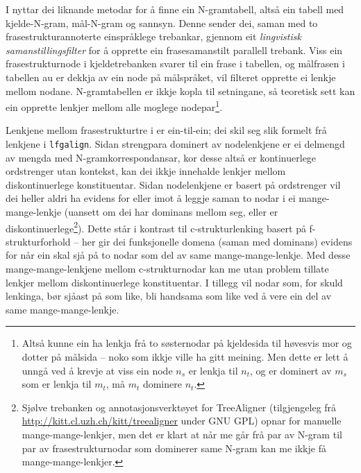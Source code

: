\documentclass[12pt,a4paper,oneside,draft]{report}
\begin{document}
 I \citet{samuelsson2007apa} nyttar dei liknande metodar for å finne
 ein N-gramtabell, altså ein tabell med kjelde-N-gram, mål-N-gram og
 sannsyn. Denne sender dei, saman med to frasestrukturannoterte
 einspråklege trebankar, gjennom eit \emph{lingvistisk  samanstillingsfilter} for å opprette ein frasesamanstilt parallell
 trebank. Viss ein frasestrukturnode i kjeldetrebanken svarer til ein
 frase i tabellen, og målfrasen i tabellen au er dekkja av ein node på
 målspråket, vil filteret opprette ei lenkje mellom nodane.
 N-gramtabellen er ikkje kopla til setningane, så teoretisk sett kan
 ein opprette lenkjer mellom alle moglege nodepar\footnote{Altså kunne ein ha lenkja frå to søsternodar på kjeldesida til
        høvesvis mor og dotter på målsida -- noko som ikkje ville ha
        gitt meining. Men dette er lett å unngå ved å krevje at viss
        ein node $n_s$ er lenkja til $n_t$, og er dominert av $m_s$
        som er lenkja til $m_t$, må $m_t$ dominere $n_t$. }.

 Lenkjene mellom frasestrukturtre i \citet{samuelsson2007apa} er
 ein-til-ein; dei skil seg slik formelt frå lenkjene i
 \texttt{lfgalign}. Sidan strengpara dominert av nodelenkjene er ei delmengd
 av mengda med N-gramkorrespondansar, kor desse altså er kontinuerlege
 ordstrenger utan kontekst, kan dei ikkje innehalde lenkjer mellom
 diskontinuerlege konstituentar. Sidan nodelenkjene er basert på
 ordstrenger vil dei heller aldri ha evidens for eller imot å leggje
 saman to nodar i ei mange-mange-lenkje (uansett om dei har dominans
 mellom seg, eller er diskontinuerlege\footnote{Sjølve trebanken \citep{samuelsson2006pap} og
        annotasjonsverktøyet for TreeAligner (tilgjengeleg frå
        \href{http://kitt.cl.uzh.ch/kitt/treealigner}{http://kitt.cl.uzh.ch/kitt/treealigner} under GNU GPL) opnar
        for manuelle mange-mange-lenkjer, men det er klart at når me
        går frå par av N-gram til par av frasestrukturnodar som
        dominerer same N-gram kan me ikkje få mange-mange-lenkjer. }). Dette står i kontrast
 til c\hyp{}strukturlenking basert på f\hyp{}strukturforhold -- her gir dei
 funksjonelle domena (saman med dominans) evidens for når ein skal sjå
 på to nodar som del av same mange-mange-lenkje.  Med desse
 mange-mange-lenkjene mellom c\hyp{}strukturnodar kan me utan problem
 tillate lenkjer mellom diskontinuerlege konstituentar. I tillegg vil
 nodar som, for skuld lenkinga, bør sjåast på som like, bli handsama
 som like ved å vere ein del av same mange-mange-lenkje.
 
\end{document}
